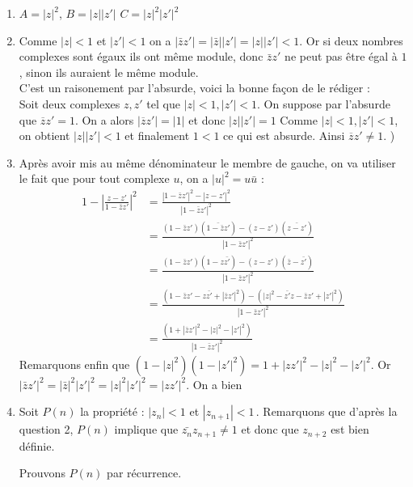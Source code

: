 \documentclass[a4paper, 11pt,reqno]{article}
\begin{document}
\begin{correction}
\begin{enumerate}
\item $A=|z|^2$, $B=|z||z'|$ $C=|z|^2|z'|^2$
\item Comme $|z|<1$ et $|z'|<1$ on a $|\bar{z}z'|= |\bar{z}| |z'| =|z||z'| <1$. Or si deux nombres complexes sont égaux ils ont même module, donc $\bar{z}z' $ ne peut pas être égal à $1$, sinon ils auraient le même module.  \\

C'est un raisonement par l'absurde, voici la bonne façon de le rédiger : \\

Soit deux complexes $z,z'$ tel que $|z|<1, |z'|<1$.  On suppose par l'absurde que $\overline{z}z'=1$. 
On a alors $|\overline{z}z'|=|1|$ et donc $|z||z'|=1$ 
Comme $|z|<1, |z'|<1$, on obtient $|z||z'|<1$ et finalement $1<1$ ce qui est absurde. Ainsi $\overline{z}z'\neq1$. )


\item Après avoir mis au même dénominateur le membre de gauche, on va utiliser le fait que pour tout complexe $u$, on a $|u|^2 = u\bar{u}$ :
\begin{align*}
1- \left| \frac{z-z'}{1-\bar{z} z' } \right|^2  &= \frac{| 1-\bar{z} z' |^2 -|z-z' |^2}{|1-\bar{z} z'  |^2}\\
&= \frac{( 1-\bar{z} z' )(\bar{ 1-\bar{z} z'} )   -(z-z' )(\bar{z-z'})}{|1-\bar{z} z'  |^2}\\
&= \frac{( 1-\bar{z} z' )(1-z\bar{z'}  )   -(z-z' )(\bar{z}-\bar{z'})}{|1-\bar{z} z'  |^2}\\
&= \frac{( 1-\bar{z} z' -z\bar{z'} + |\bar{z}z'|^2  )   -(|z|^2-\bar{z'}z - \bar{z}z' +|z'|^2)}{|1-\bar{z} z'  |^2}\\
&= \frac{( 1+ |\bar{z}z'|^2-|z|^2-|z'|^2)}{|1-\bar{z} z'  |^2}
\end{align*}
Remarquons enfin que $(1-|z|^2) (1-|z'|^2)  =1 +|zz'|^2 -|z|^2 -|z'|^2$. Or 
$ |\bar{z}z'|^2 = |\bar{z}|^2|z'|^2 =|z|^2 |z'|^2  = |zz'|^2$.
On a bien 


\item Soit $P(n)$ la propriété : \og $|z_n|<1$ et $|z_{n+1}|<1$\fg \,. Remarquons que d'après la question 2, $P(n)$ implique que $\bar{z_n}z_{n+1}\neq 1 $ et donc que $z_{n+2}$ est bien définie. 

Prouvons $P(n)$ par récurrence. 


\end{enumerate}
\end{correction}
\end{document}
